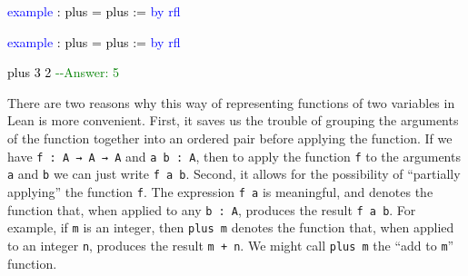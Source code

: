 \documentclass[
  letterpaper,
  DIV=11,
  numbers=noendperiod]{scrreprt}
\makeatletter
\newenvironment{Shaded}{\begin{snugshade}}{\end{snugshade}}
\newcommand{\CommentTok}[1]{\textcolor[rgb]{0.37,0.37,0.37}{#1}}
\newcommand{\DocumentationTok}[1]{\textcolor[rgb]{0.37,0.37,0.37}{\textit{#1}}}
\newcommand{\KeywordTok}[1]{\textcolor[rgb]{0.00,0.23,0.31}{#1}}
\newcommand{\NormalTok}[1]{\textcolor[rgb]{0.00,0.23,0.31}{#1}}
\newcommand{\SpecialCharTok}[1]{\textcolor[rgb]{0.37,0.37,0.37}{#1}}
\def\bluesquiggly{\bgroup \markoverwith{\textcolor[HTML]{1E90FF}{\lower3.5\p@\hbox{\sixly \char58}}}\ULon}
\renewcommand{\NormalTok}[1]{\textcolor[HTML]{000000}{#1}}
\renewcommand{\KeywordTok}[1]{\textcolor[HTML]{0000FF}{#1}}
\renewcommand{\SpecialCharTok}[1]{}
\renewcommand{\CommentTok}[1]{\textcolor[HTML]{008000}{#1}}
\renewcommand{\DocumentationTok}[1]{\bluesquiggly{\textcolor[HTML]{0000FF}{#1}}}
\theoremstyle{remark}
\makeatother
\begin{document}
\begin{Shaded}
\begin{Highlighting}[]
\KeywordTok{example}\NormalTok{ : plus = plus\textquotesingle{}\textquotesingle{} := }\KeywordTok{by} \KeywordTok{rfl}

\KeywordTok{example}\NormalTok{ : plus\textquotesingle{} = plus\textquotesingle{}\textquotesingle{} := }\KeywordTok{by} \KeywordTok{rfl}

\SpecialCharTok{++}\DocumentationTok{\#eval}\SpecialCharTok{::}\NormalTok{ plus 3 2     }\CommentTok{{-}{-}Answer: 5}
\end{Highlighting}
\end{Shaded}

There are two reasons why this way of representing functions of two
variables in Lean is more convenient. First, it saves us the trouble of
grouping the arguments of the function together into an ordered pair
before applying the function. If we have \texttt{f\ :\ A\ →\ A\ →\ A}
and \texttt{a\ b\ :\ A}, then to apply the function \texttt{f} to the
arguments \texttt{a} and \texttt{b} we can just write \texttt{f\ a\ b}.
Second, it allows for the possibility of ``partially applying'' the
function \texttt{f}. The expression \texttt{f\ a} is meaningful, and
denotes the function that, when applied to any \texttt{b\ :\ A},
produces the result \texttt{f\ a\ b}. For example, if \texttt{m} is an
integer, then \texttt{plus\ m} denotes the function that, when applied
to an integer \texttt{n}, produces the result \texttt{m\ +\ n}. We might
call \texttt{plus\ m} the ``add to \texttt{m}'' function.
\end{document}
